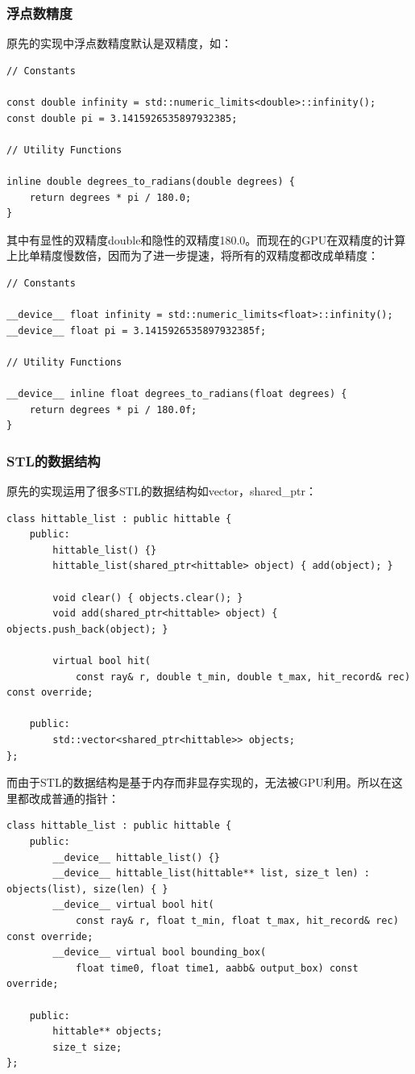 \documentclass[UTF8, a4paper, 11pt]{article}
\begin{document}
\subsubsection{浮点数精度}
原先的实现中浮点数精度默认是双精度，如：
\begin{lstlisting}
// Constants

const double infinity = std::numeric_limits<double>::infinity();
const double pi = 3.1415926535897932385;

// Utility Functions

inline double degrees_to_radians(double degrees) {
    return degrees * pi / 180.0;
}
\end{lstlisting}
其中有显性的双精度double和隐性的双精度180.0。而现在的GPU在双精度的计算上比单精度慢数倍，因而为了进一步提速，将所有的双精度都改成单精度：
\begin{lstlisting}
// Constants

__device__ float infinity = std::numeric_limits<float>::infinity();
__device__ float pi = 3.1415926535897932385f;

// Utility Functions

__device__ inline float degrees_to_radians(float degrees) {
    return degrees * pi / 180.0f;
}
\end{lstlisting}
\subsubsection{STL的数据结构}
原先的实现运用了很多STL的数据结构如vector，shared\_ptr：
\begin{lstlisting}
class hittable_list : public hittable {
    public:
        hittable_list() {}
        hittable_list(shared_ptr<hittable> object) { add(object); }

        void clear() { objects.clear(); }
        void add(shared_ptr<hittable> object) { objects.push_back(object); }

        virtual bool hit(
            const ray& r, double t_min, double t_max, hit_record& rec) const override;

    public:
        std::vector<shared_ptr<hittable>> objects;
};
\end{lstlisting}
而由于STL的数据结构是基于内存而非显存实现的，无法被GPU利用。所以在这里都改成普通的指针：
\begin{lstlisting}
class hittable_list : public hittable {
    public:
        __device__ hittable_list() {}
        __device__ hittable_list(hittable** list, size_t len) : objects(list), size(len) { }
        __device__ virtual bool hit(
            const ray& r, float t_min, float t_max, hit_record& rec) const override;
        __device__ virtual bool bounding_box(
            float time0, float time1, aabb& output_box) const override;

    public:
        hittable** objects;
        size_t size;
};
\end{lstlisting}
\end{document}
